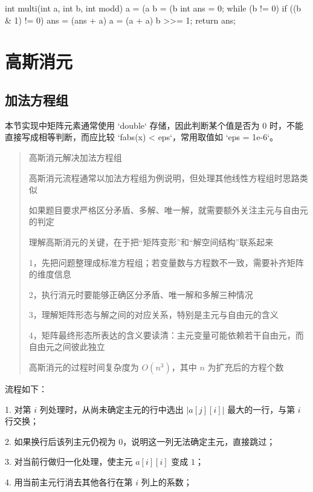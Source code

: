 \documentclass[UTF8,a4paper,11pt]{ctexart}
\begin{document}
\begin{CodeBlock}
int multi(int a, int b, int modd) {
    a = (a %
    b = (b %
    int ans = 0;
    while (b != 0) {
        if ((b & 1) != 0)
            ans = (ans + a) %
        a = (a + a) %
        b >>= 1;
    }
    return ans;
}
\end{CodeBlock}

\section{高斯消元}

\subsection{加法方程组}

本节实现中矩阵元素通常使用 `double` 存储，因此判断某个值是否为 $0$ 时，不能直接写成相等判断，而应比较 `fabs(x) < eps`，常用取值如 `eps = 1e-6`。

\begin{quote}
高斯消元解决加法方程组\par
高斯消元流程通常以加法方程组为例说明，但处理其他线性方程组时思路类似\par
如果题目要求严格区分矛盾、多解、唯一解，就需要额外关注主元与自由元的判定\par
理解高斯消元的关键，在于把“矩阵变形”和“解空间结构”联系起来\par
1，先把问题整理成标准方程组；若变量数与方程数不一致，需要补齐矩阵的维度信息\par
2，执行消元时要能够正确区分矛盾、唯一解和多解三种情况\par
3，理解矩阵形态与解之间的对应关系，特别是主元与自由元的含义\par
4，矩阵最终形态所表达的含义要读清：主元变量可能依赖若干自由元，而自由元之间彼此独立\par
高斯消元的过程时间复杂度为 $O(n^3)$，其中 $n$ 为扩充后的方程个数\par
\end{quote}

流程如下：

1. 对第 $i$ 列处理时，从尚未确定主元的行中选出 $|a[j][i]|$ 最大的一行，与第 $i$ 行交换；

2. 如果换行后该列主元仍视为 $0$，说明这一列无法确定主元，直接跳过；

3. 对当前行做归一化处理，使主元 $a[i][i]$ 变成 $1$；

4. 用当前主元行消去其他各行在第 $i$ 列上的系数；
\end{document}
